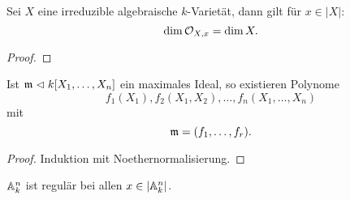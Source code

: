 \begin{lemma}
    Sei $X$ eine irreduzible algebraische $k$-Varietät, dann gilt für
    $x\in |X|$:
    \[\dim \mathcal{O}_{X,x} = \dim X.\]
\end{lemma}
\begin{proof}
\TODO
\end{proof}

\begin{lemma}
    Ist $\mathfrak{m} \vartriangleleft k[X_1,\ldots,X_n]$ ein maximales Ideal, so existieren
    Polynome
    \[f_1(X_1), f_2(X_1,X_2), \ldots, f_n(X_1,\ldots,X_n)\]
    mit
    \[\mathfrak{m} = (f_1,\ldots,f_r).\]
\end{lemma}
\begin{proof}
Induktion mit Noethernormalisierung.
\end{proof}

\begin{folgerung}
    $\mathbb{A}^n_k$ ist regulär bei allen $x \in |\mathbb{A}^n_k|$.
\end{folgerung}



